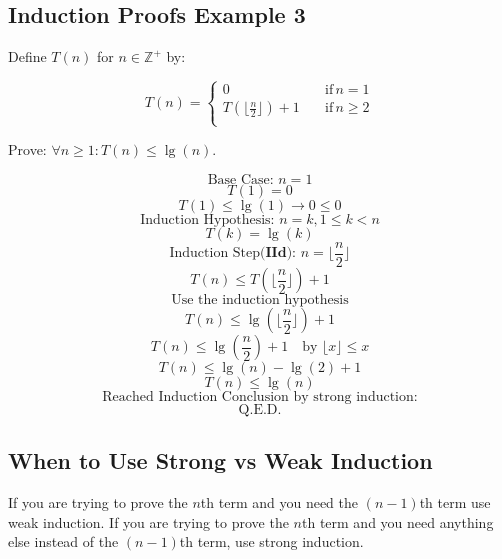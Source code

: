 \documentclass{article}
\begin{document}
\subsection{Induction Proofs Example 3}
Define $T(n)$ for $n \in \mathbb{Z}^+$ by:


\begin{equation*}
T(n)=\begin{cases}
          0 \quad &\text{if} \, n = 1 \\
          T(\lfloor \frac{n}{2} \rfloor) + 1\quad &\text{if} \, n \ge 2\\
     \end{cases}
\end{equation*}

Prove: $\forall n \ge 1: T(n) \le \lg(n)$.

$$\text{Base Case: } n = 1$$
$$T(1) = 0$$
$$T(1) \le \lg(1) \rightarrow 0 \le 0$$
$$\text{Induction Hypothesis: } n = k, 1 \le k < n $$
$$T(k) = \lg(k)$$
$$\text{Induction Step(} \textbf{IId} \text{): } n = \lfloor \frac{n}{2} \rfloor$$
$$T(n) \le T(\lfloor \frac{n}{2} \rfloor) + 1$$
$$\text{Use the induction hypothesis}$$
$$T(n) \le \lg(\lfloor \frac{n}{2} \rfloor) + 1$$
$$T(n) \le \lg(\frac{n}{2}) + 1 \quad \text{by } \lfloor x \rfloor \le x$$
$$T(n) \le \lg(n) - \lg(2) + 1 $$
$$T(n) \le \lg(n) $$
$$\text{Reached Induction Conclusion by strong induction:}$$
$$\text{Q.E.D.}$$

\subsection{When to Use Strong vs Weak Induction}

If you are trying to prove the $n$th term and you need the $(n-1)$th term use weak induction. If you are trying to prove the $n$th term and you need anything else instead of the $(n-1)$th term, use strong induction.

\iftrue
    
%
%
%
%

%
%
%
%








\fi
\end{document}
